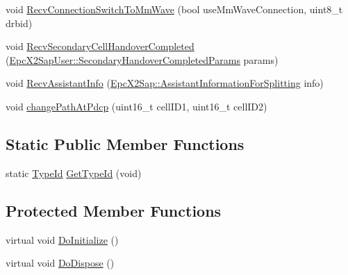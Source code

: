 \begin{DoxyCompactItemize}
void \hyperlink{classns3_1_1UeManager_a258642f79552f6e9ac3116470085286e}{Recv\+Connection\+Switch\+To\+Mm\+Wave} (bool use\+Mm\+Wave\+Connection, uint8\+\_\+t drbid)
\item 
void \hyperlink{classns3_1_1UeManager_a0af234afe9ada00168893f4aab0c18f8}{Recv\+Secondary\+Cell\+Handover\+Completed} (\hyperlink{structns3_1_1EpcX2Sap_1_1SecondaryHandoverCompletedParams}{Epc\+X2\+Sap\+User\+::\+Secondary\+Handover\+Completed\+Params} params)
\item 
void \hyperlink{classns3_1_1UeManager_a3e11e0a7509257a1e5f25024a926bbc8}{Recv\+Assistant\+Info} (\hyperlink{structns3_1_1EpcX2Sap_1_1AssistantInformationForSplitting}{Epc\+X2\+Sap\+::\+Assistant\+Information\+For\+Splitting} info)
\item 
void \hyperlink{classns3_1_1UeManager_ac96bf957b6a2bced32624cb79eeab29b}{change\+Path\+At\+Pdcp} (uint16\+\_\+t cell\+I\+D1, uint16\+\_\+t cell\+I\+D2)
\end{DoxyCompactItemize}
\subsection*{Static Public Member Functions}
\begin{DoxyCompactItemize}
\item 
static \hyperlink{classns3_1_1TypeId}{Type\+Id} \hyperlink{classns3_1_1UeManager_a03dcaf9e5a92ccf58e498e12b0f0d871}{Get\+Type\+Id} (void)
\end{DoxyCompactItemize}
\subsection*{Protected Member Functions}
\begin{DoxyCompactItemize}
\item 
virtual void \hyperlink{classns3_1_1UeManager_ae7036651fc161b02ede5c77f57a35982}{Do\+Initialize} ()
\item 
virtual void \hyperlink{classns3_1_1UeManager_af885b21caa398fa9e9b8a69dbf607a88}{Do\+Dispose} ()
\end{DoxyCompactItemize}
